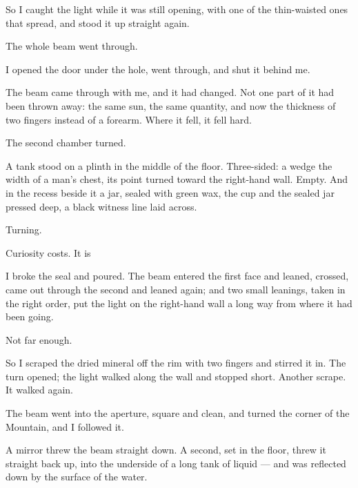 So I caught the light while it was still opening, with one of the thin-waisted ones that spread, and stood it up straight again.\par

The whole beam went through.\par

\ornament

I opened the door under the hole, went through, and shut it behind me.\par

The beam came through with me, and it had changed. Not one part of it had been thrown away: the same sun, the same quantity, and now the thickness of two fingers instead of a forearm. Where it fell, it fell hard. \par

\ornament

The second chamber turned.\par

A tank stood on a plinth in the middle of the floor. Three-sided: a wedge the width of a man's chest, its point turned toward the right-hand wall. Empty. And in the recess beside it a jar, sealed with green wax, the cup and the sealed jar pressed deep, a black witness line laid across.\par

Turning.\par

Curiosity costs. It is \par

I broke the seal and poured. The beam entered the first face and leaned, crossed, came out through the second and leaned again; and two small leanings, taken in the right order, put the light on the right-hand wall a long way from where it had been going.\par

Not far enough.\par

So I scraped the dried mineral off the rim with two fingers and stirred it in. The turn opened; the light walked along the wall and stopped short. Another scrape. It walked again.\par

The beam went into the aperture, square and clean, and turned the corner of the Mountain, and I followed it.\par

\ornament

A mirror threw the beam straight down. A second, set in the floor, threw it straight back up, into the underside of a long tank of liquid --- and was reflected down by the surface of the water.\par

